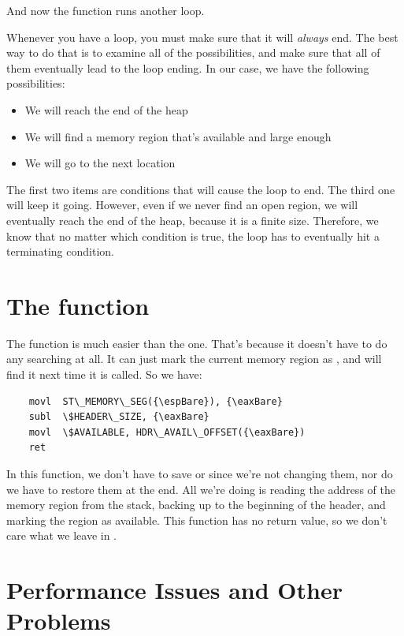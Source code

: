 And now the function runs another loop.

Whenever you have a loop, you must make sure that it will \emph{always} 
end.  The best way to do that is to examine all of the possibilities, and make sure that
all of them eventually lead to the loop ending.  In our case, we have the following 
possibilities:

\begin{itemize}
\item We will reach the end of the heap 
\item We will find a memory region that's available and large enough 
\item We will go to the next location 
\end{itemize}

The first two items are conditions that will cause the loop to end.  The third one
will keep it going.  However, even if we never find an open region, 
we will eventually reach the end of the heap, because it is a finite size.  Therefore, we know
that no matter which condition is true, the loop has to eventually hit a terminating condition.

\section{The  function}

The  function is much easier than the 
 one.
That's because it doesn't have to do any searching at all.  It can just mark
the current memory region as , and 
will find it next time it is called.   So we have:

\begin{simpletyping}
\begin{lstlisting}
	movl  ST\_MEMORY\_SEG({\espBare}), {\eaxBare}
	subl  \$HEADER\_SIZE, {\eaxBare}
	movl  \$AVAILABLE, HDR\_AVAIL\_OFFSET({\eaxBare})
	ret
\end{lstlisting}
\end{simpletyping}

In this function, we don't have to save {\ebpRegIdx} or {\espRegIdx}
since we're not changing them, nor do we have to restore them at the end.  All we're
doing is reading the address of the memory region from the stack, backing up to the
beginning of the header, and marking the region as available.  This function has no
return value, so we don't care what we leave in {\eaxReg}.

\section{Performance Issues and Other Problems}

